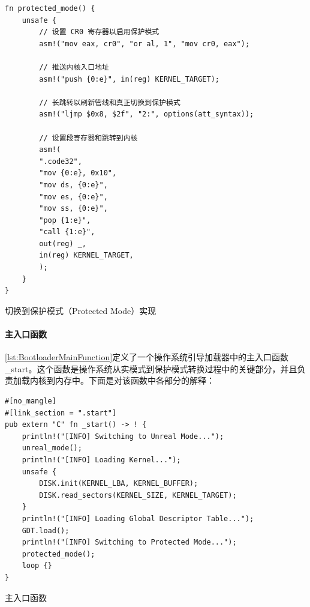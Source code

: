\begin{listing}[htbp]
    \begin{verbatim}
fn protected_mode() {
    unsafe {
        // 设置 CR0 寄存器以启用保护模式
        asm!("mov eax, cr0", "or al, 1", "mov cr0, eax");

        // 推送内核入口地址
        asm!("push {0:e}", in(reg) KERNEL_TARGET);

        // 长跳转以刷新管线和真正切换到保护模式
        asm!("ljmp $0x8, $2f", "2:", options(att_syntax));

        // 设置段寄存器和跳转到内核
        asm!(
        ".code32",
        "mov {0:e}, 0x10",
        "mov ds, {0:e}",
        "mov es, {0:e}",
        "mov ss, {0:e}",
        "pop {1:e}",
        "call {1:e}",
        out(reg) _,
        in(reg) KERNEL_TARGET,
        );
    }
}
    \end{verbatim}
    \caption{切换到保护模式（Protected Mode）实现}\label{lst:ProtectedModeMethod}
\end{listing}

\paragraph{主入口函数}

\cref{lst:BootloaderMainFunction}定义了一个操作系统引导加载器中的主入口函数 \_start。这个函数是操作系统从实模式到保护模式转换过程中的关键部分，并且负责加载内核到内存中。下面是对该函数中各部分的解释：

\begin{listing}[htbp]
    \begin{verbatim}
#[no_mangle]
#[link_section = ".start"]
pub extern "C" fn _start() -> ! {
    println!("[INFO] Switching to Unreal Mode...");
    unreal_mode();
    println!("[INFO] Loading Kernel...");
    unsafe {
        DISK.init(KERNEL_LBA, KERNEL_BUFFER);
        DISK.read_sectors(KERNEL_SIZE, KERNEL_TARGET);
    }
    println!("[INFO] Loading Global Descriptor Table...");
    GDT.load();
    println!("[INFO] Switching to Protected Mode...");
    protected_mode();
    loop {}
}
    \end{verbatim}
    \caption{主入口函数}\label{lst:BootloaderMainFunction}
\end{listing}

